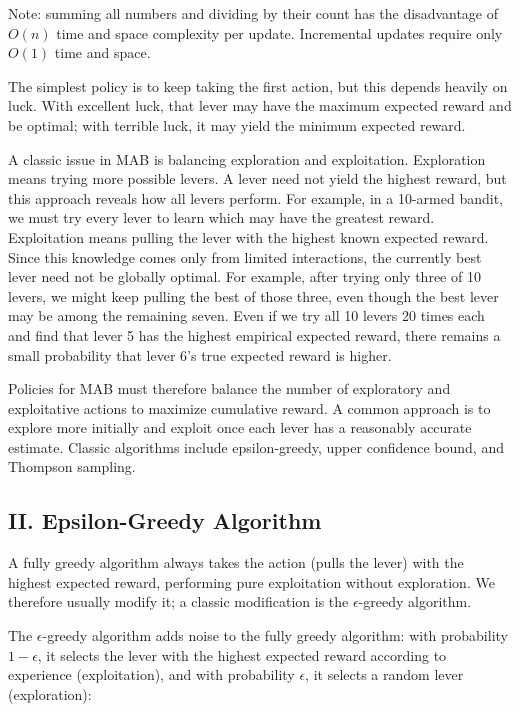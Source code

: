 Note: summing all numbers and dividing by their count has the disadvantage of \(O(n)\) time and space complexity per update. Incremental updates require only \(O(1)\) time and space.

The simplest policy is to keep taking the first action, but this depends heavily on luck. With excellent luck, that lever may have the maximum expected reward and be optimal; with terrible luck, it may yield the minimum expected reward.

A classic issue in MAB is balancing exploration and exploitation. Exploration means trying more possible levers. A lever need not yield the highest reward, but this approach reveals how all levers perform. For example, in a 10-armed bandit, we must try every lever to learn which may have the greatest reward. Exploitation means pulling the lever with the highest known expected reward. Since this knowledge comes only from limited interactions, the currently best lever need not be globally optimal. For example, after trying only three of 10 levers, we might keep pulling the best of those three, even though the best lever may be among the remaining seven. Even if we try all 10 levers 20 times each and find that lever 5 has the highest empirical expected reward, there remains a small probability that lever 6's true expected reward is higher.

Policies for MAB must therefore balance the number of exploratory and exploitative actions to maximize cumulative reward. A common approach is to explore more initially and exploit once each lever has a reasonably accurate estimate. Classic algorithms include epsilon-greedy, upper confidence bound, and Thompson sampling.

\hypertarget{ii.-epsilon-greedy-algorithm}{%
\subsection{II. Epsilon-Greedy Algorithm}\label{ii.-epsilon-greedy-algorithm}}

A fully greedy algorithm always takes the action (pulls the lever) with the highest expected reward, performing pure exploitation without exploration. We therefore usually modify it; a classic modification is the \(\epsilon\)-greedy algorithm.

The \(\epsilon\)-greedy algorithm adds noise to the fully greedy algorithm: with probability \(1-\epsilon\), it selects the lever with the highest expected reward according to experience (exploitation), and with probability \(\epsilon\), it selects a random lever (exploration):

